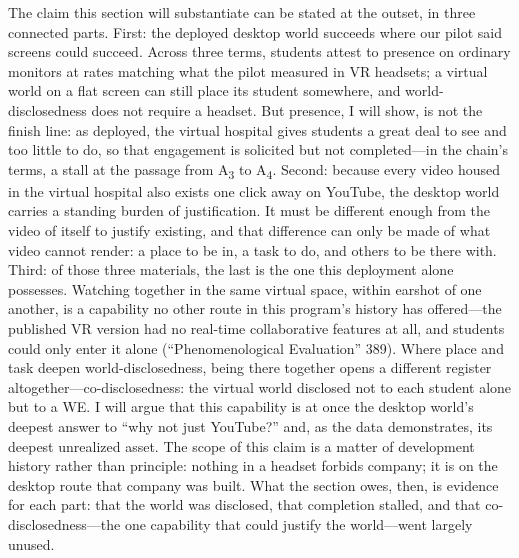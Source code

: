 The claim this section will substantiate can be stated at the outset, in three
connected parts. First: the deployed desktop world succeeds where our pilot said
screens could succeed. Across three terms, students attest to presence on
ordinary monitors at rates matching what the pilot measured in VR headsets; a
virtual world on a flat screen can still place its student somewhere, and
world-disclosedness does not require a headset. But
presence, I will show, is not the finish line: as deployed, the virtual hospital
gives students a great deal to see and too little to do, so that engagement is
solicited but not completed---in the chain's terms, a stall at the passage from
A\textsubscript{3} to A\textsubscript{4}. Second: because every video housed in
the virtual hospital also exists one click away on YouTube, the desktop world
carries a standing burden of justification. It must be different enough from the
video of itself to justify existing, and that difference can only be made of
what video cannot render: a place to be in, a task to do, and others to be there
with. Third: of those three materials, the last is the one this deployment alone
possesses. Watching together in the same virtual space, within earshot of one
another, is a capability no other route in this program's history has
offered---the published VR version had no real-time collaborative features at
all, and students could only enter it alone (``Phenomenological Evaluation''
389). Where place and task deepen world-disclosedness, being there together
opens a different register altogether---co-disclosedness: the virtual world
disclosed not to each student alone but to a WE. I will argue that this
capability is at once the desktop world's deepest answer to ``why not just
YouTube?'' and, as the data demonstrates, its deepest unrealized asset. The
scope of this claim is a matter of development history rather than principle:
nothing in a headset forbids company; it is on the desktop route that company
was built. What the section owes, then, is evidence for each part: that the
world was disclosed, that completion stalled, and that
co-disclosedness---the one capability that could justify the world---went
largely unused.


